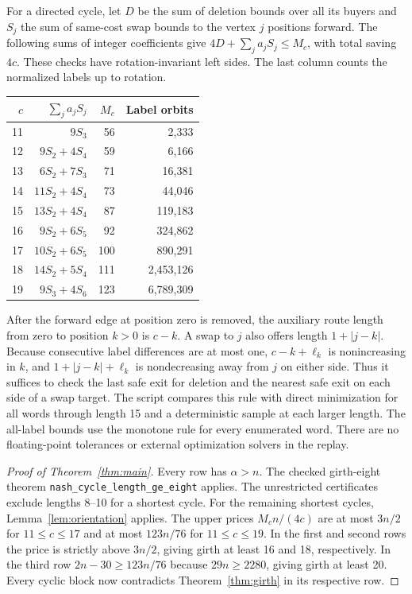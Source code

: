 \documentclass[11pt]{article}
\newcommand{\abs}[1]{\left|#1\right|}
\begin{document}
For a directed cycle, let \(D\) be the sum of deletion bounds
over all its buyers and \(S_j\) the sum of same-cost swap bounds
to the vertex \(j\) positions forward. The following sums of
integer coefficients give \(4D+\sum_j a_jS_j\le M_c\), with
total saving \(4c\). These checks have rotation-invariant
left sides. The last column counts the normalized labels up to
rotation.
\begin{center}
\begin{tabular}{rrrr}
\toprule
\(c\) & \(\sum_j a_jS_j\) & \(M_c\) & Label orbits\\
\midrule
11 & \(9S_3\)          & 56  & 2,333\\
12 & \(9S_2+4S_4\)     & 59  & 6,166\\
13 & \(6S_2+7S_3\)     & 71  & 16,381\\
14 & \(11S_2+4S_4\)    & 73  & 44,046\\
15 & \(13S_2+4S_4\)    & 87  & 119,183\\
16 & \(9S_2+6S_5\)     & 92  & 324,862\\
17 & \(10S_2+6S_5\)    & 100 & 890,291\\
18 & \(14S_2+5S_4\)    & 111 & 2,453,126\\
19 & \(9S_3+4S_6\)     & 123 & 6,789,309\\
\bottomrule
\end{tabular}
\end{center}

After the forward edge at position zero is removed, the auxiliary
route length from zero to position \(k>0\) is \(c-k\).
A swap to \(j\) also offers length \(1+\abs{j-k}\).
Because consecutive label differences are at most one,
\(c-k+\ell_k\) is nonincreasing in \(k\), and
\(1+\abs{j-k}+\ell_k\) is nondecreasing away from \(j\) on
either side. Thus it suffices to check the last safe exit
for deletion and the nearest safe exit on each side of a swap
target. The script compares this rule with direct minimization
for all words through length 15 and a deterministic sample
at each larger length. The all-label bounds use the monotone rule
for every enumerated word. There are no floating-point tolerances
or external optimization solvers in the replay.

\begin{proof}[Proof of Theorem~\ref{thm:main}]
Every row has \(\alpha>n\). The checked girth-eight theorem
\nolinkurl{nash_cycle_length_ge_eight} applies.
The unrestricted certificates exclude lengths 8--10 for a
shortest cycle. For the remaining shortest cycles,
Lemma~\ref{lem:orientation} applies. The upper prices
\(M_c n/(4c)\) are at most \(3n/2\) for \(11\le c\le17\)
and at most \(123n/76\) for \(11\le c\le19\).
In the first and second rows the price is strictly above
\(3n/2\), giving girth at least 16 and 18, respectively.
In the third row \(2n-30\ge123n/76\) because \(29n\ge2280\),
giving girth at least 20. Every cyclic block now contradicts
Theorem~\ref{thm:girth} in its respective row.
\end{proof}
\end{document}
